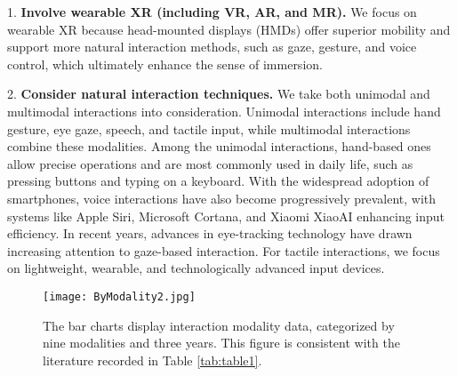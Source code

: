 \documentclass[review]{fcs}
\newcommand{\revise}[2]{\textcolor[rgb]{0,0,0}{#2}}
\begin{document}
1. \textbf{\revise{Wearable XR (including VR, AR, and MR).}{Involve wearable XR (including VR, AR, and MR).}} We focus on wearable XR because head-mounted displays (HMDs) offer superior mobility and support more natural interaction methods, such as gaze, gesture, and voice control, which ultimately enhance the sense of immersion.

2. \textbf{\revise{Considering natural interaction techniques.}{Consider natural interaction techniques.}} \revise{We examined both unimodal and multimodal interactions.}{We take both unimodal and multimodal interactions into consideration.}  \revise{Unimodal interactions include hand gestures, eye gaze, speech, and tactile inputs, while multimodal interactions combine these modalities.}{Unimodal interactions include hand gesture, eye gaze, speech, and tactile input, while multimodal interactions combine these modalities.} \revise{Among the unimodal types, hand-based interactions are the most common in everyday life, such as pouring water or typing on a keyboard, and they allow for precise operations.}{Among the unimodal interactions, hand-based ones allow precise operations and are most commonly used in daily life, such as pressing buttons and typing on a keyboard.} \revise{With the widespread adoption of smartphones, voice interaction has also gained significant use, with systems like Apple Siri, Microsoft Cortana, and Xiaomi XiaoAI improving input efficiency.}{With the widespread adoption of smartphones, voice interactions have also become progressively prevalent, with systems like Apple Siri, Microsoft Cortana, and Xiaomi XiaoAI enhancing input efficiency.} In recent years, advances in eye-tracking technology have drawn increasing attention to gaze-based interaction. For tactile interactions, we focus on lightweight, wearable, and technologically advanced input devices.

\begin{figure*}
    \begin{center}
    \texttt{[image: ByModality2.jpg]}
    \end{center}
    \caption{
The bar charts display interaction modality data, categorized by nine modalities and three years. This figure is consistent with the literature recorded in Table \ref{tab:table1}.
    }
    \label{fig:bymodality}
\end{figure*}
\end{document}
